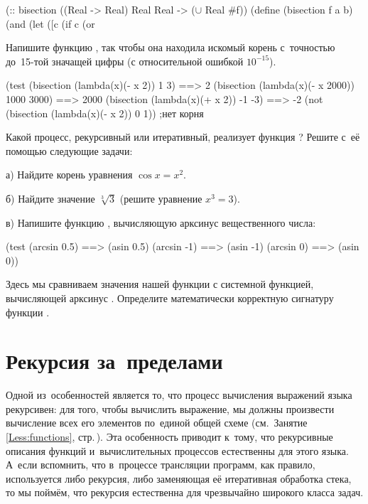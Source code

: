 \newcommand{\cmt}{\normalfont\itshape\color{gray!40!black}}
\begin{Definition}[emph={f,a,b}]
(:: bisection ((Real -> Real) Real Real -> ($\cup$ Real #f))
(define (bisection f a b)
  (and %
       (let ([c %
         (if %
             c
             (or %
\end{Definition}\vspace{-\medskipamount}

\newpage
\begin{Assignment}

Напишите функцию , так чтобы она находила искомый корень с~точностью до~15-той значащей цифры (с относительной ошибкой $10^{-15}$).

\begin{Specification}
  (test 
    (bisection (lambda(x)(- x 2)) 1 3)          ==> 2
    (bisection (lambda(x)(- x 2000)) 1000 3000) ==> 2000
    (bisection (lambda(x)(+ x 2)) -1 -3)        ==> -2
    (not (bisection (lambda(x)(- x 2)) 0 1))    ;нет корня    
\end{Specification}

Какой процесс, рекурсивный или итеративный, реализует функция ? Решите с~её помощью следующие задачи:

 а) Найдите корень уравнения $\cos x = x^2$.
 
 б) Найдите значение $\sqrt[3]3$ (решите уравнение $x^3 = 3$).

 в) Напишите функцию , вычисляющую арксинус вещественного числа:
\begin{Specification}
  (test 
    (arcsin 0.5)  ==> (asin 0.5)
    (arcsin -1)   ==> (asin -1)
    (arcsin 0)    ==> (asin 0))
\end{Specification}
Здесь мы сравниваем значения нашей функции с системной функцией, вычисляющей арксинус . Определите математически корректную сигнатуру функции .

\end{Assignment}

\section{Рекурсия за~преде\-лами~\Scheme}%
Одной из~особенностей \Scheme является то, что процесс вычисления выражений языка рекурсивен: для того, чтобы вычислить выражение, мы должны произвести вычисление всех его элементов по~единой общей схеме (см.~Занятие\,\ref{Less:functions}, стр.\,\pageref{applicative-order}). Эта особенность приводит к~тому, что рекурсивные описания функций и~вычислительных процессов естественны для этого языка. А~если вспомнить, что в~процессе трансляции программ, как правило, используется либо рекурсия, либо заменяющая её итеративная обработка стека, то мы поймём, что рекурсия естественна для чрезвычайно широкого класса задач.

